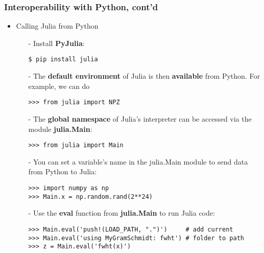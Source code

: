 \documentclass[t,usepdftitle=false]{beamer}
\begin{document}
\begin{frame}[fragile]
	\frametitle{Interoperability with Python, cont'd}
\begin{itemize}
\item Calling Julia from Python
\begin{itemize}\normalsize
\item[-] Install \textbf{PyJulia}:
\begin{verbatim}
$ pip install julia
\end{verbatim}
\item[-] The \textbf{default environment} of Julia is then \textbf{available} from Python. For example, we can do
\begin{verbatim}
>>> from julia import NPZ
\end{verbatim}
\item[-] The \textbf{global namespace} of Julia's interpreter can be accessed via the module \textbf{julia.Main}:
\begin{verbatim}
>>> from julia import Main
\end{verbatim}
\item[-] You can set a variable's name in the julia.Main module to send data from Python to Julia:
\begin{verbatim}
>>> import numpy as np
>>> Main.x = np.random.rand(2**24)
\end{verbatim}
\item[-] Use the \textbf{eval} function from \textbf{julia.Main} to run Julia code:
\begin{verbatim}
>>> Main.eval('push!(LOAD_PATH, ".")')     # add current
>>> Main.eval('using MyGramSchmidt: fwht') # folder to path
>>> z = Main.eval('fwht(x)')
\end{verbatim}
\end{itemize}
\end{itemize}
\end{frame}  
\end{document}

